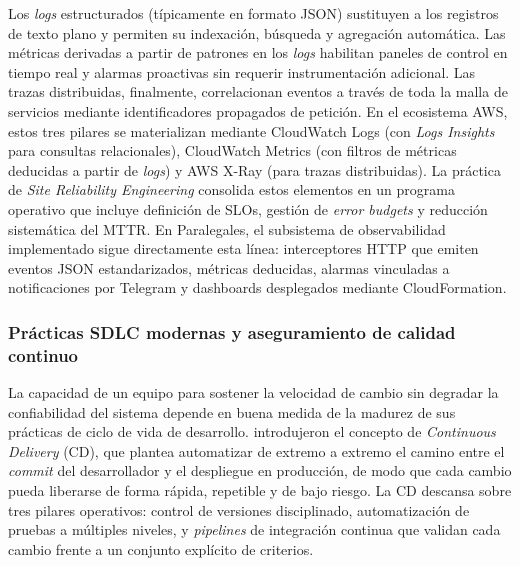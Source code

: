 Los \textit{logs} estructurados (típicamente en formato JSON) sustituyen a los registros de texto plano y permiten su indexación, búsqueda y agregación automática. Las métricas derivadas a partir de patrones en los \textit{logs} habilitan paneles de control en tiempo real y alarmas proactivas sin requerir instrumentación adicional. Las trazas distribuidas, finalmente, correlacionan eventos a través de toda la malla de servicios mediante identificadores propagados de petición. En el ecosistema AWS, estos tres pilares se materializan mediante CloudWatch Logs (con \textit{Logs Insights} para consultas relacionales), CloudWatch Metrics (con filtros de métricas deducidas a partir de \textit{logs}) y AWS X-Ray (para trazas distribuidas). La práctica de \textit{Site Reliability Engineering} \cite{Beyer2016} consolida estos elementos en un programa operativo que incluye definición de SLOs, gestión de \textit{error budgets} y reducción sistemática del MTTR. En Paralegales, el subsistema de observabilidad implementado sigue directamente esta línea: interceptores HTTP que emiten eventos JSON estandarizados, métricas deducidas, alarmas vinculadas a notificaciones por Telegram y dashboards desplegados mediante CloudFormation.

\subsubsection{Prácticas SDLC modernas y aseguramiento de calidad continuo}

La capacidad de un equipo para sostener la velocidad de cambio sin degradar la confiabilidad del sistema depende en buena medida de la madurez de sus prácticas de ciclo de vida de desarrollo. \textcite{Humble2010} introdujeron el concepto de \textit{Continuous Delivery} (CD), que plantea automatizar de extremo a extremo el camino entre el \textit{commit} del desarrollador y el despliegue en producción, de modo que cada cambio pueda liberarse de forma rápida, repetible y de bajo riesgo. La CD descansa sobre tres pilares operativos: control de versiones disciplinado, automatización de pruebas a múltiples niveles, y \textit{pipelines} de integración continua que validan cada cambio frente a un conjunto explícito de criterios.

